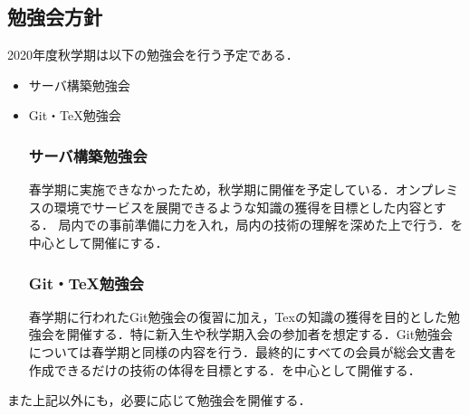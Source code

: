 \subsection*{勉強会方針}


2020年度秋学期は以下の勉強会を行う予定である．
\begin{itemize}
    \item サーバ構築勉強会
\item Git・TeX勉強会

    \subsubsection*{サーバ構築勉強会}
    春学期に実施できなかったため，秋学期に開催を予定している．オンプレミスの環境でサービスを展開できるような知識の獲得を目標とした内容とする．
		局内での事前準備に力を入れ，局内の技術の理解を深めた上で行う．\secondGrade{}を中心として開催にする．
\subsubsection*{Git・TeX勉強会}
    春学期に行われたGit勉強会の復習に加え，Texの知識の獲得を目的とした勉強会を開催する．特に新入生や秋学期入会の参加者を想定する．Git勉強会については春学期と同様の内容を行う．最終的にすべての会員が総会文書を作成できるだけの技術の体得を目標とする．\secondgrade{}を中心として開催する．
\end{itemize}
また上記以外にも，必要に応じて勉強会を開催する．
